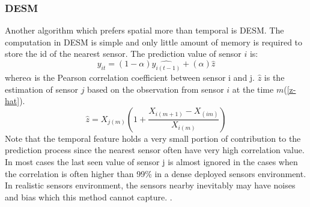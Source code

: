 \subsubsection{DESM}
Another algorithm which prefers spatial more than temporal is DESM\cite{LI:DESM}. The computation in DESM is simple and only little amount of memory is required to store the id of the nearest sensor.  The prediction value of sensor $i$ is:
\begin{equation}
\hat{y_{it}} = (1-\alpha)\hat{y_{i(t-1)}} + (\alpha)\hat{z}
\end{equation}
where$\alpha$ is the Pearson correlation coefficient between sensor i and j. $\hat{z}$ is the estimation of sensor $j$ based on the observation from sensor $i$ at the time $m$(\ref{z-hat}). 
\begin{equation}
\hat{z} = X_{j(m)}(1+\frac{X_{i(m+1)}-X_{(im)}}{X_{i(m)}})
\label{z-hat}
\end{equation}
Note that the temporal feature holds a very small portion of contribution to the prediction process since the nearest sensor often have very high correlation value. In most cases the last seen value of sensor j is almost ignored in the cases when the correlation is often higher than 99\% in a dense deployed sensors environment. In realistic sensors environment, the sensors nearby inevitably may have noises and bias which this method cannot capture. .
